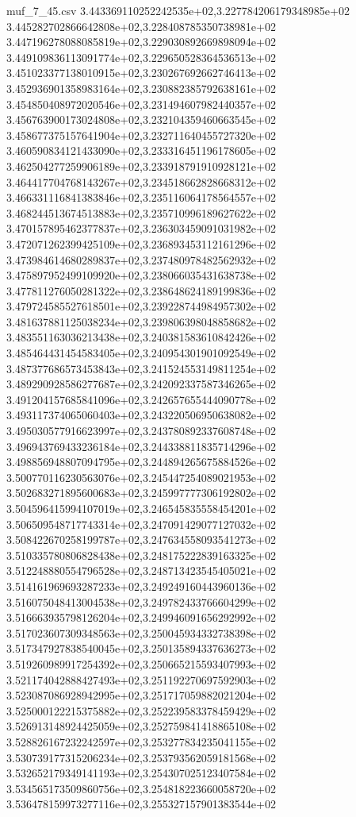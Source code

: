 \begin{filecontents*}{muf_7_45.csv}
3.443369110252242535e+02,3.227784206179348985e+02
3.445282702866642808e+02,3.228408785350738981e+02
3.447196278088085819e+02,3.229030892669898094e+02
3.449109836113091774e+02,3.229650528364536513e+02
3.451023377138010915e+02,3.230267692662746413e+02
3.452936901358983164e+02,3.230882385792638161e+02
3.454850408972020546e+02,3.231494607982440357e+02
3.456763900173024808e+02,3.232104359460663545e+02
3.458677375157641904e+02,3.232711640455727320e+02
3.460590834121433090e+02,3.233316451196178605e+02
3.462504277259906189e+02,3.233918791910928121e+02
3.464417704768143267e+02,3.234518662828668312e+02
3.466331116841383846e+02,3.235116064178564557e+02
3.468244513674513883e+02,3.235710996189627622e+02
3.470157895462377837e+02,3.236303459091031982e+02
3.472071262399425109e+02,3.236893453112161296e+02
3.473984614680289837e+02,3.237480978482562932e+02
3.475897952499109920e+02,3.238066035431638738e+02
3.477811276050281322e+02,3.238648624189199836e+02
3.479724585527618501e+02,3.239228744984957302e+02
3.481637881125038234e+02,3.239806398048858682e+02
3.483551163036213438e+02,3.240381583610842426e+02
3.485464431454583405e+02,3.240954301901092549e+02
3.487377686573453843e+02,3.241524553149811254e+02
3.489290928586277687e+02,3.242092337587346265e+02
3.491204157685841096e+02,3.242657655444090778e+02
3.493117374065060403e+02,3.243220506950638082e+02
3.495030577916623997e+02,3.243780892337608748e+02
3.496943769433236184e+02,3.244338811835714296e+02
3.498856948807094795e+02,3.244894265675884526e+02
3.500770116230563076e+02,3.245447254089021953e+02
3.502683271895600683e+02,3.245997777306192802e+02
3.504596415994107019e+02,3.246545835558454201e+02
3.506509548717743314e+02,3.247091429077127032e+02
3.508422670258199787e+02,3.247634558093541273e+02
3.510335780806828438e+02,3.248175222839163325e+02
3.512248880554796528e+02,3.248713423545405021e+02
3.514161969693287233e+02,3.249249160443960136e+02
3.516075048413004538e+02,3.249782433766604299e+02
3.516663935798126204e+02,3.249946091656292992e+02
3.517023607309348563e+02,3.250045934332738398e+02
3.517347927838540045e+02,3.250135894337636273e+02
3.519260989917254392e+02,3.250665215593407993e+02
3.521174042888427493e+02,3.251192270697592903e+02
3.523087086928942995e+02,3.251717059882021204e+02
3.525000122215375882e+02,3.252239583378459429e+02
3.526913148924425059e+02,3.252759841418865108e+02
3.528826167232242597e+02,3.253277834235041155e+02
3.530739177315206234e+02,3.253793562059181568e+02
3.532652179349141193e+02,3.254307025123407584e+02
3.534565173509860756e+02,3.254818223660058720e+02
3.536478159973277116e+02,3.255327157901383544e+02

\end{filecontents*}
